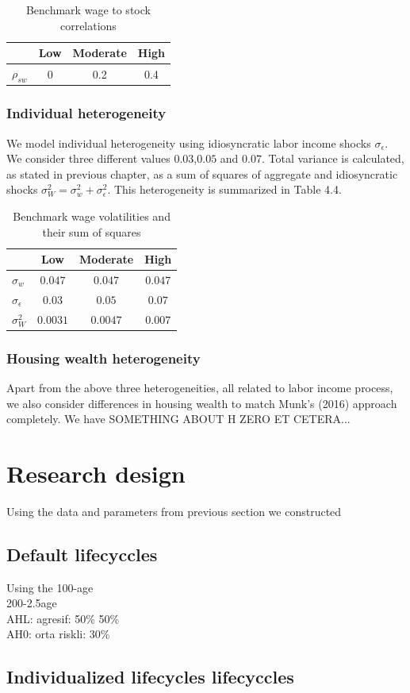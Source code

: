 \begin{table}
	\centering
	\begin{tabular}[c]{c|ccc}
		&Low&Moderate&High\\
		\hline
		$\rho_{sw}$&0&0.2&0.4
	\end{tabular}
	\caption{Benchmark wage to stock correlations}
\end{table}


\subsubsection{Individual heterogeneity}

We model individual heterogeneity using idiosyncratic labor income shocks $\sigma_{\epsilon}$. We consider three different values $0.03$,$0.05$ and $0.07$. Total variance is calculated, as stated in previous chapter, as a sum of squares of aggregate and idiosyncratic shocks $\sigma^2_W = \sigma^2_w + \sigma^2_{\epsilon}$. This heterogeneity is summarized in Table 4.4. 


\begin{table}
	\centering
	\begin{tabular}[c]{l|ccc}
		&Low&Moderate&High\\
		\hline
		$\sigma_w$&$0.047$&$0.047$&$0.047$\\
		$\sigma_{\epsilon}$&$0.03$&$0.05$&$0.07$\\
		$\sigma^2_{W}$&$0.0031$&$0.0047$&$0.007$
	\end{tabular}
	\caption{Benchmark wage volatilities and their sum of squares}
\end{table}


\subsubsection{Housing wealth heterogeneity}

Apart from the above three heterogeneities, all related to labor income process, we also consider differences in housing wealth to match Munk's (2016) approach completely. We have SOMETHING ABOUT H ZERO ET CETERA...


\section{Research design}
Using the data and parameters from previous section we constructed 
\subsection{Default lifecyccles}
Using the 
100-age\\
200-2.5age\\
AHL: agresif: 50\% 50\% \\
AH0: orta riskli: 30\% \\


\subsection{Individualized lifecycles lifecyccles}
